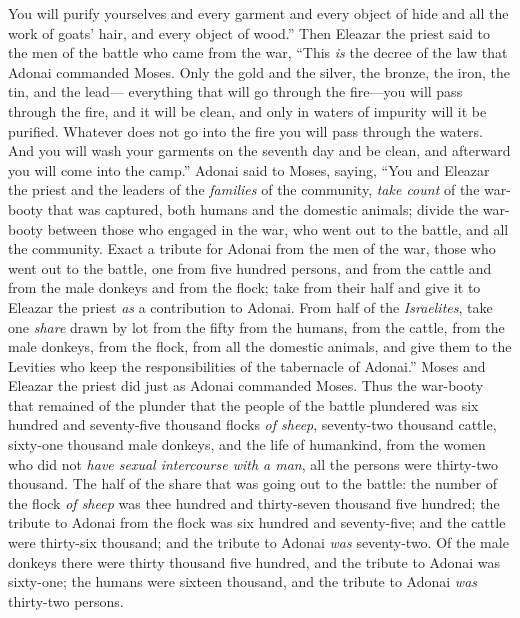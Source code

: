 \begin{biblechapter}
\verse You will purify yourselves and every garment and every object of hide and all the work of goats’ hair, and every object of wood.”
\verse Then Eleazar the priest said to the men of the battle who came from the war, “This \textit{is} the decree of the law that Adonai commanded Moses.
\verse Only the gold and the silver, the bronze, the iron, the tin, and the lead—
\verse everything that will go through the fire—you will pass through the fire, and it will be clean, and only in waters of impurity will it be purified. Whatever does not go into the fire you will pass through the waters.
\verse And you will wash your garments on the seventh day and be clean, and afterward you will come into the camp.”
 Adonai said to Moses, saying,
\verse “You and Eleazar the priest and the leaders of the \textit{families} of the community, \textit{take count} of the war-booty that was captured, both humans and the domestic animals;
\verse divide the war-booty between those who engaged in the war, who went out to the battle, and all the community.
\verse Exact a tribute for Adonai from the men of the war, those who went out to the battle, one from five hundred persons, and from the cattle and from the male donkeys and from the flock;
\verse take from their half and give it to Eleazar the priest \textit{as} a contribution to Adonai.
\verse From half of the \textit{Israelites}, take one \textit{share} drawn by lot from the fifty from the humans, from the cattle, from the male donkeys, from the flock, from all the domestic animals, and give them to the Levities who keep the responsibilities of the tabernacle of Adonai.”
\verse Moses and Eleazar the priest did just as Adonai commanded Moses.
\verse Thus the war-booty that remained of the plunder that the people of the battle plundered was six hundred and seventy-five thousand flocks \textit{of sheep},
\verse seventy-two thousand cattle,
\verse sixty-one thousand male donkeys,
\verse and the life of humankind, from the women who did not \textit{have sexual intercourse with a man}, all the persons were thirty-two thousand.
\verse The half of the share that was going out to the battle: the number of the flock \textit{of sheep} was thee hundred and thirty-seven thousand five hundred;
\verse the tribute to Adonai from the flock was six hundred and seventy-five;
\verse and the cattle were thirty-six thousand; and the tribute to Adonai \textit{was} seventy-two.
\verse Of the male donkeys there were thirty thousand five hundred, and the tribute to Adonai was sixty-one;
\verse the humans were sixteen thousand, and the tribute to Adonai \textit{was} thirty-two persons.

\end{biblechapter}

